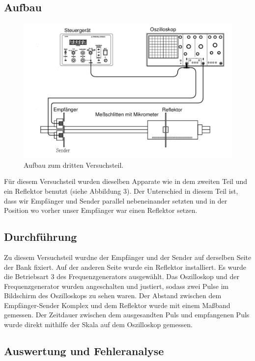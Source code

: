 \documentclass[11pt,a4paper]{article}
\begin{document}
\subsection{Aufbau}
\begin{figure}[h]
	\centering
	\includegraphics[scale=0.5]{Abb3}
	\caption{Aufbau zum dritten Versuchsteil. \cite{Anleitung}}
\end{figure}
Für diesem Versuchsteil wurden dieselben Apparate wie in dem zweiten Teil und ein Reflektor benutzt (siehe Abbildung 3). Der Unterschied in diesem Teil ist, dass wir Empf\"anger und Sender parallel nebeneinander setzten und in der Position wo vorher unser Empf\"anger war einen Reflektor setzen.

\subsection{Durchführung}
Zu diesem Versuchsteil wurdne der Empfänger und der Sender auf derselben Seite der Bank fixiert. Auf der anderen Seite wurde ein Reflektor installiert. Es wurde die Betriebsart 3 des Frequenzgenerators ausgewählt. Das Oszilloskop und der Frequenzgenerator wurden angeschalten und justiert, sodass zwei Pulse im Bildschirm des Oszilloskops zu sehen waren. Der Abstand zwischen dem Empfänger-Sender Komplex und dem Reflektor wurde mit einem Maßband gemessen. Der Zeitdauer zwischen dem ausgesandten Puls und empfangenen Puls wurde direkt mithilfe der Skala auf dem Oszilloskop gemessen. 

\subsection{Auswertung und Fehleranalyse}
\end{document}
